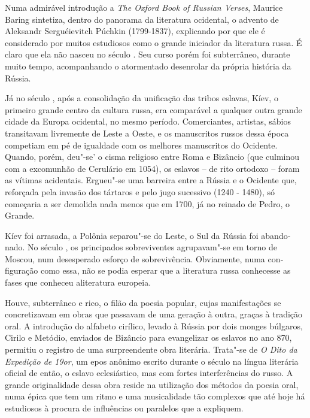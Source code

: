 Numa admirável introdução a \emph{The Oxford Book of Russian Verses},
Maurice Baring sintetiza, dentro do panorama da literatura ocidental, o
advento de Aleksandr Serguéievitch Púchkin (1799-1837), explicando por
que ele é considerado por muitos estudiosos como o grande iniciador da
literatura russa. É claro que ela não nasceu no século . Seu curso
porém foi subterrâneo, durante muito tempo, acompanhando o atormentado
desenrolar da própria história da Rússia.

Já no século , após a consolidação da unificação das tribos eslavas,
Kíev, o primeiro grande centro da cultura russa, era comparável a
qualquer outra grande cidade da Europa ocidental, no mesmo período.
Comerciantes, artistas, sábios transitavam livremente de Leste a Oeste,
e os manuscritos russos dessa época competiam em pé de igualdade com os
melhores manuscritos do Ocidente. Quando, porém, deu"-se' o cisma
religioso entre Roma e Bizâncio (que culmi­nou com a excomunhão de
Cerulário em 1054), os eslavos -- de rito ortodoxo -- foram as vítimas
acidentais. Ergueu"-se uma barreira entre a Rússia e o Ociden­te que,
reforçada pela invasão dos tártaros e pelo jugo sucessivo (1240 - 1480),
só começaria a ser demolida nada menos que em 1700, já no reinado de
Pedro, o Grande.

Kíev foi arrasada, a Polônia separou"-se do Leste, o Sul da Rússia foi
abando­nado. No século , os principados sobreviventes agrupavam"-se em
torno de Moscou, num desesperado esforço de sobrevivência. Obviamente,
numa con­figuração como essa, não se podia esperar que a literatura
russa conhecesse as fases que conheceu aliteratura europeia.

Houve, subterrâneo e rico, o filão da poesia popular, cujas
manifestações se concretizavam em obras que passavam de uma geração à
outra, graças à tradi­ção oral. A introdução do alfabeto cirílico,
levado à Rússia por dois monges búlgaros, Cirilo e Metódio, enviados de
Bizâncio para evangelizar os eslavos no ano 870, permitiu o registro de
uma surpreendente obra literária. Trata"-se de \emph{O Dito da Expedição de
19or}, um epos anônimo escrito durante o século  na língua literária
oficial de então, o eslavo eclesiástico, mas com fortes interfe­rências
do russo. A grande originalidade dessa obra reside na utilização dos
métodos da poesia oral, numa épica que tem um ritmo e uma musicalidade
tão complexos que até hoje há estudiosos à procura de influências ou
paralelos que a expliquem.

